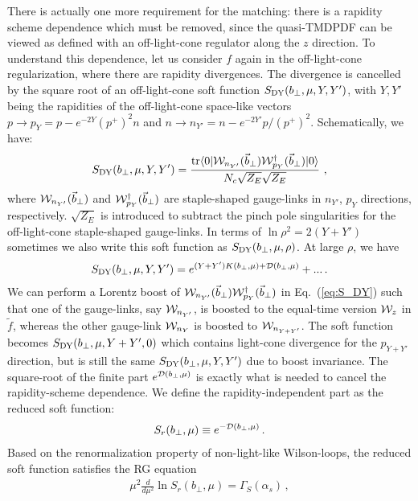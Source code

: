 \documentclass[aps,rmp,reprint,amsmath,amssymb,graphicx,longbibliography]{revtex4-1} %
\DeclareRobustCommand{\eq}[1]{Eq.~(\ref{eq:#1})}
\begin{document}
There is actually one more requirement for the matching: there is a rapidity scheme dependence which must
be removed, since the quasi-TMDPDF can be viewed as defined with an off-light-cone regulator along the $z$ direction. To understand this dependence, let us consider $f$ again in the off-light-cone regularization, where there are rapidity divergences. The divergence is cancelled by the square root of an off-light-cone soft function $S_{\rm DY}(b_\perp,\mu,Y,Y')$, with $Y,Y'$ being the rapidities of the off-light-cone space-like vectors $p\rightarrow p_Y= p-e^{-2Y}(p^+)^2n $ and $n \rightarrow n_{Y'}=n-e^{-2Y'}p/(p^+)^2$. Schematically, we have:
\begin{align}\label{eq:S_DY}
	S_{\rm DY}(b_\perp,\mu,Y,Y')= \frac{{\rm tr}\langle 0|{\cal W}_{n_{Y'}}(\vec{b}_\perp) {\cal W}^{\dagger}_{p_Y}(\vec{b}_\perp)|0\rangle}{N_c\sqrt{Z_E}\sqrt{Z_E}}  \ ,
\end{align}
where ${\cal W}_{n_{Y'}}(\vec{b}_\perp)$ and ${\cal W}^{\dagger}_{p_Y}(\vec{b}_\perp)$ are staple-shaped gauge-links in $n_{Y'}$, $p_Y$ directions, respectively. $\sqrt{Z_E}$ is introduced to subtract the pinch pole singularities for the off-light-cone staple-shaped gauge-links. In terms of $\ln \rho^2=2(Y+Y')$ sometimes we also write this soft function as $S_{\rm DY}(b_\perp,\mu,\rho)$. At large $\rho $, we have
\begin{align}
	S_{\rm DY}(b_\perp,\mu,Y,Y')= e^{(Y+Y') K(b_\perp,\mu)+{\cal D}(b_\perp,\mu)}+... \,.
\end{align}
We can perform a Lorentz boost of ${\cal W}_{n_{Y'}}(\vec{b}_\perp) {\cal W}^{\dagger}_{p_Y}(\vec{b}_\perp)$ in \eq{S_DY} such that one of the gauge-links, say ${\cal W}_{n_{Y'}}$, is boosted to the equal-time version ${\cal W}_z$ in $\tilde f$, whereas the other gauge-link ${\cal W}_{n_{Y}}$ is boosted to ${\cal W}_{n_{Y+Y'}}$. The soft function becomes $S_{\rm DY}(b_\perp,\mu,Y+Y',0)$ which
contains light-cone divergence for the $p_{Y+Y'}$ direction, but is still the same $S_{\rm DY}(b_\perp,\mu,Y,Y')$ due to boost invariance. The square-root of the finite part $e^{{\cal D}(b_\perp,\mu)}$
is exactly what is needed to cancel the rapidity-scheme dependence. We define the rapidity-independent part as
the reduced soft function:
\begin{align}\label{eq:reduced}
	S_r(b_\perp,\mu)\equiv e^{-{\cal D}(b_\perp,\mu)} \,.
\end{align}
Based on the renormalization property of non-light-like Wilson-loops, the reduced soft function satisfies the RG equation
\begin{align}
	\mu^2 \frac{d}{d\mu^2} \ln S_r(b_\perp,\mu)=\Gamma_S(\alpha_s) \,,
\end{align}
\end{document}

